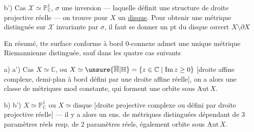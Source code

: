 b') Cas $\mathcal X\simeq\mathbb P^1_{\mathbb C}$, $\sigma$ une inversion --- laquelle définit une structure de droite projective réelle --- on trouve  pour $X$ un \uline{disque}. Pour obtenir une métrique distinguée sur $\mathcal X$ invariante par $\sigma$, il faut se donner un pt du disque ouvert $X\setminus\partial X$


En résumé, tte surface conforme à bord 0-connexe admet une unique métrique Riemannienne distinguée, sauf dans les quatre cas suivants

a) a') Cas $X\simeq\mathbb C$, ou $X\simeq\unsure{\overline{\mathbb H}|\mathbb H}=\{z\in\mathbb C\mid\mathrm{Im}\,z\geq0\}$ [droite affine complexe, demi-plan à bord défini par une droite affine réelle], on a alors une classe de métriques mod constante, qui forment une orbite sous $\mathrm{Aut}\,X$.

b) b') $X\simeq\mathbb P^1_{\mathbb C}$ ou $X\simeq\text{disque}$ [droite projective complexe ou  défini par droite projective réelle] --- il y a alors un ens. de métriques distinguées dépendant de 3 paramètres réels resp. de 2 paramètres réels, également orbite sous $\mathrm{Aut}\,X$.
